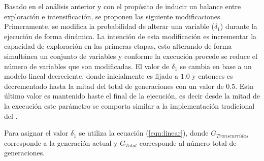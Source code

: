Basado en el análisis anterior y con el propósito de inducir un balance entre exploración e intensificación, se proponen las siguiente modificaciones.
%
Primeramente, se modifica la probabilidad de alterar una variable ($\delta_1$) durante la ejecución de forma dinámica.
%
La intención de esta modificación es incrementar la capacidad de exploración en las primeras etapas, esto alterando de forma simultánea un conjunto de variables y conforme la execución procede se reduce el número de variables que son modificadas.
%
El valor de $\delta_1$ se cambia en base a un modelo lineal decreciente, donde inicialmente es fijado a $1.0$ y entonces es decrementado hasta la mitad del total de generaciones con un valor de $0.5$.
%
Esta último valor es mantenido haste el final de la ejecución, es decir desde la mitad de la execución este parámetro se comporta similar a la implementación tradicional del \SBX{}.
%

Para asignar el valor $\delta_1$ se utiliza la ecuación (\ref{eqn:linear}), donde $G_{Transcurridas}$ corresponde a la generación actual y $G_{Total}$ corresponde al número total de generaciones.

